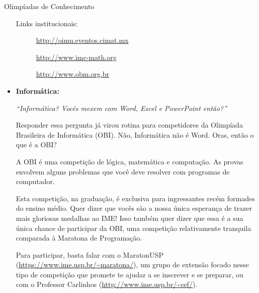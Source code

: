 \begin{subsecao}{Olimpíadas de Conhecimento}
\begin{itemize}
Links institucionais:

\begin{description}
  \item[] \url{http://oimu.eventos.cimat.mx}
  \item[] \url{http://www.imc-math.org}
  \item[] \url{http://www.obm.org.br}
\end{description}

\item{\bf Informática: }

\textit{``Informática? Vocês mexem com Word, Excel e PowerPoint então?''}

Responder essa pergunta já virou rotina para competidores da Olimpíada
Brasileira de Informática (OBI). Não, Informática não é Word. Oras, então o que é a OBI?

A OBI é uma competição de lógica, matemática e computação. As provas envolvem
alguns problemas que você deve resolver com programas de computador.

Esta competição, na graduação, é exclusiva para ingressantes recém formades do
ensino médio. Quer dizer que vocês são a nossa única esperança de trazer mais
gloriosas medalhas ao IME! Isso também quer dizer que essa é a sua única chance
de participar da OBI, uma competição relativamente tranquila comparada à
Maratona de Programação.

Para participar, basta falar com o MaratonUSP
(\url{https://www.ime.usp.br/~maratona/}), um grupo de extensão focado nesse
tipo de competição que promete te ajudar a se inscrever e se preparar, ou com o
Professor Carlinhos (\url{http://www.ime.usp.br/~cef/}).






\end{itemize}
\end{subsecao}
